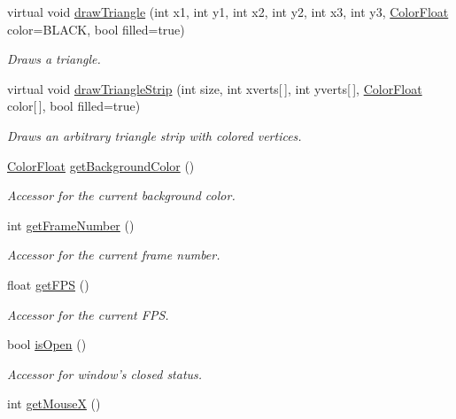 \begin{DoxyCompactItemize}
virtual void \hyperlink{classtsgl_1_1_canvas_a8abc9ed7d3c55c5d701009040c65000e}{draw\-Triangle} (int x1, int y1, int x2, int y2, int x3, int y3, \hyperlink{structtsgl_1_1_color_float}{Color\-Float} color=B\-L\-A\-C\-K, bool filled=true)
\begin{DoxyCompactList}\small\item\em Draws a triangle. \end{DoxyCompactList}\item 
virtual void \hyperlink{classtsgl_1_1_canvas_a8f570c258a8900178190ec15ac074a57}{draw\-Triangle\-Strip} (int size, int xverts\mbox{[}$\,$\mbox{]}, int yverts\mbox{[}$\,$\mbox{]}, \hyperlink{structtsgl_1_1_color_float}{Color\-Float} color\mbox{[}$\,$\mbox{]}, bool filled=true)
\begin{DoxyCompactList}\small\item\em Draws an arbitrary triangle strip with colored vertices. \end{DoxyCompactList}\item 
\hyperlink{structtsgl_1_1_color_float}{Color\-Float} \hyperlink{classtsgl_1_1_canvas_a2b39e50888d61e88527a66ac0f6ac880}{get\-Background\-Color} ()
\begin{DoxyCompactList}\small\item\em Accessor for the current background color. \end{DoxyCompactList}\item 
int \hyperlink{classtsgl_1_1_canvas_af4f8f2b1abd27316a4a39ae097407d37}{get\-Frame\-Number} ()
\begin{DoxyCompactList}\small\item\em Accessor for the current frame number. \end{DoxyCompactList}\item 
float \hyperlink{classtsgl_1_1_canvas_a1c8ac321138948650a3006f325dfb886}{get\-F\-P\-S} ()
\begin{DoxyCompactList}\small\item\em Accessor for the current F\-P\-S. \end{DoxyCompactList}\item 
bool \hyperlink{classtsgl_1_1_canvas_ada31408e9a96ecb1639f552d8f0de475}{is\-Open} ()
\begin{DoxyCompactList}\small\item\em Accessor for window's closed status. \end{DoxyCompactList}\item 
int \hyperlink{classtsgl_1_1_canvas_a4af9bed83746f998474039185d2a765a}{get\-Mouse\-X} ()

\end{DoxyCompactItemize}
